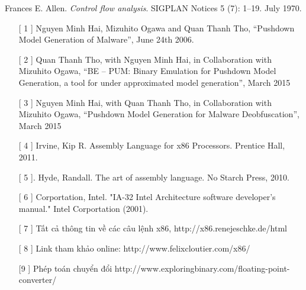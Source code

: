 
\begin{thebibliography}{}

Frances E. Allen. \emph{Control flow analysis}. SIGPLAN Notices 5 (7): 1–19. July 1970.
\end{thebibliography}

\begin{itemize}
	\item[[ 1]] Nguyen Minh Hai, Mizuhito Ogawa and Quan Thanh Tho, “Pushdown Model Generation of Malware”, June 24th 2006.
	\item[[ 2]] Quan Thanh Tho, with Nguyen Minh Hai, in Collaboration with Mizuhito Ogawa, “BE – PUM: Binary Emulation for Pushdown Model Generation, a tool for under approximated model generation”, March 2015
	\item[[ 3]] Nguyen Minh Hai, with Quan Thanh Tho, in Collaboration with Mizuhito Ogawa, “Pushdown Model Generation for Malware Deobfuscation”, March 2015
	\item[[ 4]] Irvine, Kip R. Assembly Language for x86 Processors. Prentice Hall, 2011. 
	\item[[ 5]]. Hyde, Randall. The art of assembly language. No Starch Press, 2010.
	\item[[ 6]] Corportation, Intel. "IA-32 Intel Architecture software developer’s manual." Intel Corportation (2001).
	\item[[ 7]] Tất cả thông tin về các câu lệnh x86, http://x86.renejeschke.de/html
	\item[[ 8]] Link tham khảo online: http://www.felixcloutier.com/x86/ 
	\item[[9]] Phép toán chuyển đổi http://www.exploringbinary.com/floating-point-converter/

\end{itemize}